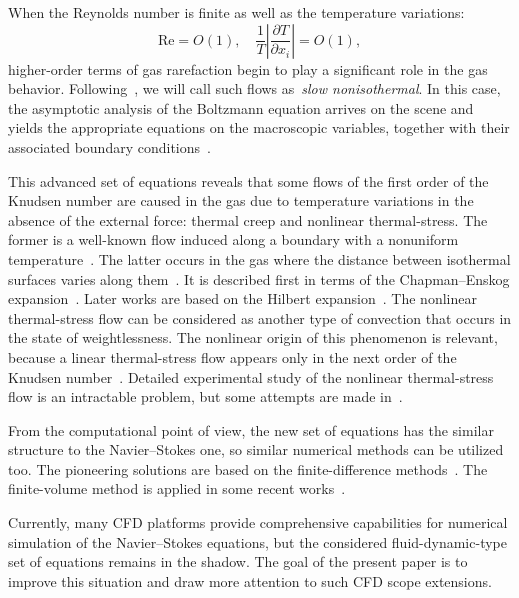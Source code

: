 \documentclass[smallextended]{svjour3} %
\newcommand{\pder}[2][]{\frac{\partial#1}{\partial#2}}
\begin{document}
When the Reynolds number is finite as well as the temperature variations:
\[ \mathrm{Re} = O(1), \quad \frac1T\left|\pder[T]{x_i}\right| = O(1), \]
higher-order terms of gas rarefaction begin to play a significant role in the gas behavior.
Following~\cite{Kogan1976}, we will call such flows as~\emph{slow nonisothermal}.
In this case, the asymptotic analysis of the Boltzmann equation arrives on the scene and
yields the appropriate equations on the macroscopic variables, together with
their associated boundary conditions~\cite{Sone2002, Sone2007}.

This advanced set of equations reveals that some flows of the first order of the Knudsen number
are caused in the gas due to temperature variations in the absence of the external force:
thermal creep and nonlinear thermal-stress. The former is a well-known flow induced along a boundary
with a nonuniform temperature~\cite{Maxwell1879Stresses, Ohwada1989Creep}.
The latter occurs in the gas where the distance between isothermal surfaces varies along them~\cite{Kogan1976}.
It is described first in terms of the Chapman--Enskog expansion~\cite{Kogan1971}.
Later works are based on the Hilbert expansion~\cite{SoneBobylev96}.
The nonlinear thermal-stress flow can be considered as another type of convection
that occurs in the state of weightlessness.
The nonlinear origin of this phenomenon is relevant, because a linear thermal-stress flow
appears only in the next order of the Knudsen number~\cite{Sone1972Stress}.
Detailed experimental study of the nonlinear thermal-stress flow is an intractable problem,
but some attempts are made in~\cite{ExperimentsNTFS2003}.

From the computational point of view, the new set of equations has the similar structure
to the Navier--Stokes one, so similar numerical methods can be utilized too.
The pioneering solutions are based on the finite-difference
methods~\cite{SoneBobylev96, Aleksandrov2002Tube, Aleksandrov2008Particle}.
The finite-volume method is applied in some recent works~\cite{Laneryd2006, Laneryd2007}.

Currently, many CFD platforms provide comprehensive
capabilities for numerical simulation of the Navier--Stokes equations,
but the considered fluid-dynamic-type set of equations remains in the shadow.
The goal of the present paper is to improve this situation and
draw more attention to such CFD scope extensions.
\end{document}
